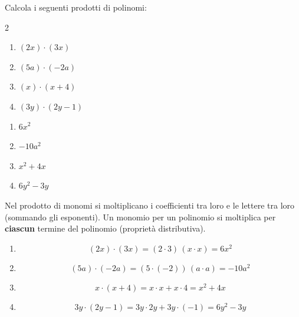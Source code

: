 \begin{question}[ID=1.1, subtitle={Prodotti di monomi e polinomi}, tags={prodotti, polinomi}, difficulty=facile]
Calcola i seguenti prodotti di polinomi:
\begin{center}\begin{minipage}{0.92\linewidth}
\begin{multicols}{2}
\begin{enumerate}[leftmargin=3.2cm]
\item $(2x) \cdot (3x)$
\item $(5a) \cdot(-2a)$
\item $(x) \cdot (x+4)$
\item $(3y) \cdot (2y-1)$
\end{enumerate}
\end{multicols}
\end{minipage}\end{center}
\begin{solution}
\begin{enumerate}
    \item $6x^2$
    \item $-10a^2$
    \item $x^2+4x$
    \item $6y^2-3y$
\end{enumerate}
\end{solution}
\begin{explanation}
Nel prodotto di monomi si moltiplicano i coefficienti tra loro e le lettere tra loro (sommando gli esponenti). Un monomio per un polinomio si moltiplica per \textbf{ciascun} termine del polinomio (proprietà distributiva).
\begin{enumerate}
    \item \[ (2x)\cdot(3x)=(2\cdot3)\,(x\cdot x)=6x^2 \]
    \item \[ (5a)\cdot(-2a)=(5\cdot(-2))\,(a\cdot a)=-10a^2 \]
    \item \[ x\cdot(x+4)=x\cdot x+x\cdot4=x^2+4x \]
    \item \[ 3y\cdot(2y-1)=3y\cdot2y+3y\cdot(-1)=6y^2-3y \]
\end{enumerate}
\end{explanation}
\end{question}


